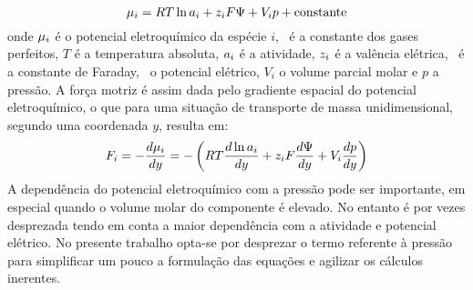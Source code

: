 \begin{equation}
\label{eq:potq}
\mu_{i}=R T\ln a_{i} + z_{i}F\Psi + V_{i}p + \mathrm{constante} 	
\end{equation}%
onde $\mu_{i}$ é o potencial eletroquímico da espécie $i$, \ctegases\ é a constante dos gases perfeitos, $T$ é a temperatura absoluta, $a_{i}$ é a atividade, $z_{i}$ é a valência elétrica, \ctefaraday\ é a constante de Faraday, \potencial\ o potencial elétrico, $V_{i}$ o volume parcial molar e $p$ a pressão. A força motriz é assim dada pelo gradiente espacial do potencial eletroquímico, o que para uma situação de transporte de massa unidimensional, segundo uma coordenada $y$, resulta em:
\begin{equation}
	\label{eq:formo}
	F_{i}=-\frac{d\mu_{i}}{dy}=-\left(R T\frac{d\ln a_{i}}{dy}+z_{i}F\frac{d\Psi}{dy}+V_{i}\frac{dp}{dy}\right)
\end{equation}
A dependência do potencial eletroquímico com a pressão pode ser importante, em especial quando o volume molar do componente é elevado. No entanto é por vezes desprezada tendo em conta a maior dependência com a atividade e potencial elétrico. No presente trabalho opta-se por desprezar o termo referente à pressão para simplificar um pouco a formulação das equações e agilizar os cálculos inerentes.

